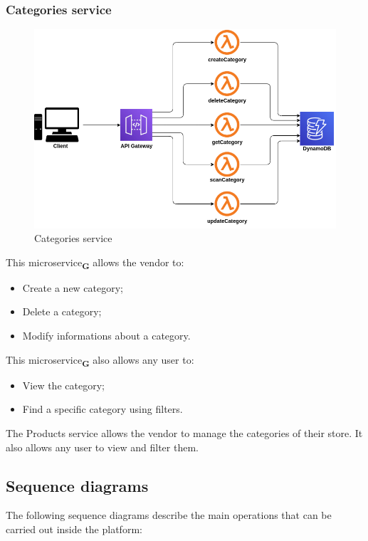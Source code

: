\subsubsection{Categories service}
\begin{figure}[!h]
    \vspace{5px}
    \includegraphics[scale=0.5]{../../../../Images/Diagrammi/maintainerManual/categoriesService.png}
    \centering
    \caption{Categories service}
\end{figure}
This microservice\textsubscript{\textbf{G}} allows the vendor to:
\begin{itemize}
    \item Create a new category;
    \item Delete a category;
    \item Modify informations about a category.
\end{itemize}
This microservice\textsubscript{\textbf{G}} also allows any user to:
\begin{itemize}
    \item View the category;
    \item Find a specific category using filters.
\end{itemize}
The Products service allows the vendor to manage the categories of their store. It also allows any user to view and filter them.

\pagebreak
\subsection{Sequence diagrams}
The following sequence diagrams describe the main operations that can be carried out inside the platform:

